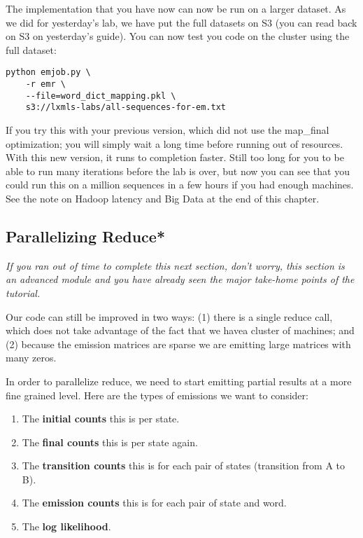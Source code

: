 The implementation that you have now can now be run on a larger dataset. As we
did for yesterday's lab, we have put the full datasets on S3 (you can read back
on S3 on yesterday's guide). You can now test you code on the cluster using the
full dataset:

\begin{verbatim}
python emjob.py \
    -r emr \
    --file=word_dict_mapping.pkl \
    s3://lxmls-labs/all-sequences-for-em.txt
\end{verbatim}

If you try this with your previous version, which did not use the map\_final
optimization; you will simply wait a long time before running out of
resources. With this new version, it runs to completion faster. Still too long
for you to be able to run many iterations before the lab is over, but now you
can see that you could run this on a million sequences in a few hours if you
had enough machines. See the note on Hadoop latency and Big Data at the end of
this chapter.

\subsection{Parallelizing Reduce*}

\emph{If you ran out of time to complete this next section, don't worry, this
section is an advanced module and you have already seen the major take-home
points of the tutorial.}

Our code can still be improved in two ways: (1) there is a single reduce call,
which does not take advantage of the fact that we havea cluster of machines;
and (2) because the emission matrices are sparse we are emitting large matrices
with many zeros. %

In order to parallelize reduce, we need to start emitting partial results at a
more fine grained level. Here are the types of emissions we want to consider:

\begin{enumerate}
\item The \textbf{initial counts} this is per state.
\item The \textbf{final counts} this is per state again.
\item The \textbf{transition counts} this is for each pair of states (transition from A to B).
\item The \textbf{emission counts} this is for each pair of state and word.
\item The \textbf{log likelihood}.
\end{enumerate}


